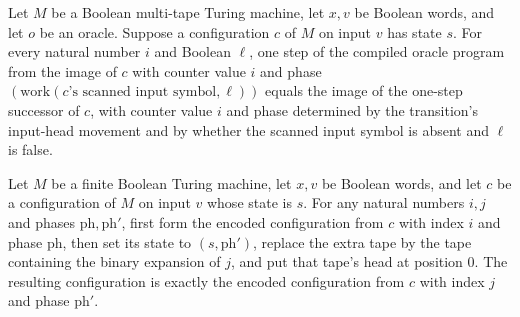 \begin{theorem}
\label{Complexity.LogProg.OIS.work_step}
\leanok
{}
Let $M$ be a Boolean multi-tape Turing machine, let $x,v$ be Boolean words, and let $o$
be an oracle. Suppose a configuration $c$ of $M$ on input $v$ has state $s$. For every
natural number $i$ and Boolean $\ell$, one step of the compiled oracle program from the
image of $c$ with counter value $i$ and phase $(\mathrm{work}(c\text{'s scanned input
symbol},\ell))$ equals the image of the one-step successor of $c$, with counter value
$i$ and phase determined by the transition's input-head movement and by whether the
scanned input symbol is absent and $\ell$ is false.
\end{theorem}

\begin{theorem}
\label{Complexity.LogProg.OIS.index_view}
\leanok
{}
Let $M$ be a finite Boolean Turing machine, let $x,v$ be Boolean words, and let $c$ be a
configuration of $M$ on input $v$ whose state is $s$. For any natural numbers $i,j$ and
phases $\mathrm{ph},\mathrm{ph}'$, first form the encoded configuration from $c$ with
index $i$ and phase $\mathrm{ph}$, then set its state to $(s,\mathrm{ph}')$, replace the
extra tape by the tape containing the binary expansion of $j$, and put that tape's head
at position $0$. The resulting configuration is exactly the encoded configuration from
$c$ with index $j$ and phase $\mathrm{ph}'$.
\end{theorem}

